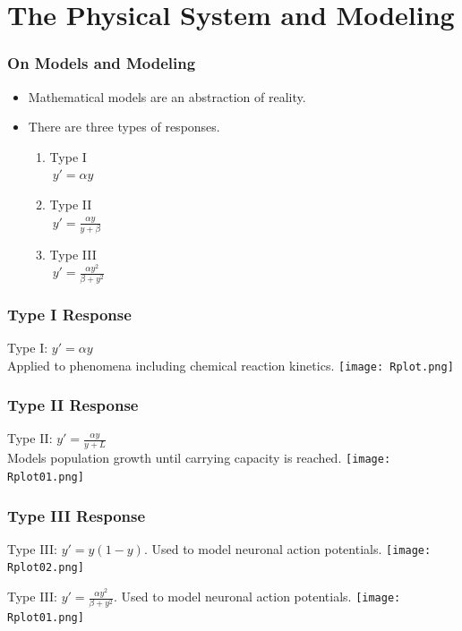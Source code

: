 
\section{The Physical System and Modeling}
\begin{frame}\frametitle{On Models and Modeling}
  \begin{itemize}
	\item Mathematical models are an abstraction of reality.
	\item There are three types of responses. 
	\begin{enumerate}
		\item Type I\\
		$\ y'=\alpha y$
		\item Type II\\
		$\ y' = \frac{\alpha y}{y+ \beta}$ 
		\item Type III\\
		$\ y'= \frac {\alpha y^2}{\beta + y^2}$
	\end{enumerate}
  \end{itemize}
\end{frame}

\begin{frame}
  \frametitle{Type I Response}
   Type I: $y'=\alpha y$\\ Applied to phenomena including chemical reaction kinetics.
   \texttt{[image: Rplot.png]}
\end{frame}

\begin{frame}
  \frametitle{Type II Response} 

    Type II: $y'=\frac{\alpha y}{y+L}$\\Models population growth until carrying capacity is reached.
   \texttt{[image: Rplot01.png]}

\end{frame}

\begin{frame}
  \frametitle{Type III Response}
    Type III: $y'=y(1-y)$. Used to model neuronal action potentials.
    \texttt{[image: Rplot02.png]}
\end{frame}
\begin{frame}
    Type III: $y'=\frac{\alpha y^2}{\beta+y^2}$. Used to model neuronal action potentials.
    \texttt{[image: Rplot01.png]}
\end{frame}

